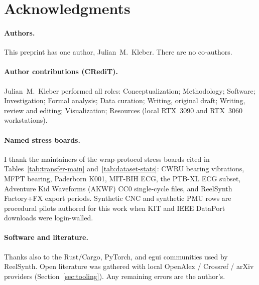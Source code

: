 \section*{Acknowledgments}
\label{sec:acknowledgments}

\paragraph{Authors.}
This preprint has one author, Julian~M.~Kleber. There are no co-authors.

\paragraph{Author contributions (CRediT).}
Julian~M.~Kleber performed all roles: Conceptualization; Methodology; Software; Investigation; Formal analysis; Data curation; Writing, original draft; Writing, review and editing; Visualization; Resources (local RTX~3090 and RTX~3060 workstations).

\paragraph{Named stress boards.}
I thank the maintainers of the wrap-protocol stress boards cited in Tables~\ref{tab:transfer-main} and~\ref{tab:dataset-stats}:
CWRU bearing vibrations, MFPT bearing, Paderborn K001, MIT-BIH ECG, the PTB-XL ECG subset, Adventure Kid Waveforms (AKWF) CC0 single-cycle files, and ReelSynth Factory+FX export periods.
Synthetic CNC and synthetic PMU rows are procedural pilots authored for this work when KIT and IEEE DataPort downloads were login-walled.

\paragraph{Software and literature.}
Thanks also to the Rust/Cargo, PyTorch, and egui communities used by ReelSynth.
Open literature was gathered with local OpenAlex / Crossref / arXiv providers (Section~\ref{sec:tooling}).
Any remaining errors are the author's.

